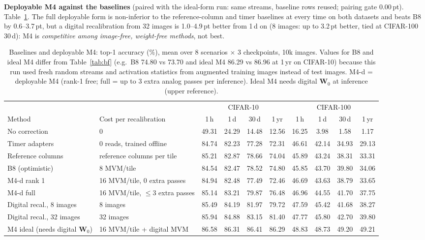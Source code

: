 \documentclass[journal]{IEEEtran}
\newcommand{\mfour}{\textsc{M4}}
\newcommand{\bviii}{\textsc{B8}}
\newcommand{\pt}{\,pt}
\newcommand{\W}{\mathbf{W}}
\begin{document}
\textbf{Deployable \mfour{} against the baselines} (paired with the ideal-form run: same streams, baseline rows reused; pairing gate 0.00\pt). Table~\ref{tab:h2}. The full deployable form is non-inferior to the reference-column and timer baselines at every time on both datasets and beats \bviii{} by 0.6--3.7\pt, but a digital recalibration from 32 images is 1.0--4.9\pt{} better from 1\,d on (8 images: up to 3.2\pt{} better, tied at CIFAR-100 30\,d): \mfour{} is \emph{competitive among image-free, weight-free methods}, not best.

\begin{table}[t]
\caption{Baselines and deployable \mfour: top-1 accuracy (\%), mean over 8 scenarios $\times$ 3 checkpoints, 10k images. Values for \bviii{} and ideal \mfour{} differ from Table~\ref{tab:bf} (e.g.\ \bviii{} 74.80 vs 73.70 and ideal \mfour{} 86.29 vs 86.96 at 1\,yr on CIFAR-10) because this run used fresh random streams and activation statistics from augmented training images instead of test images. \mfour-d = deployable \mfour{} (rank-1 free; full = up to 3 extra analog passes per inference). Ideal \mfour{} needs digital $\W_0$ at inference (upper reference).}
\label{tab:h2}
\centering\footnotesize
\begin{tabular}{lp{2.6cm}cccccccc}
\toprule
 & & \multicolumn{4}{c}{CIFAR-10} & \multicolumn{4}{c}{CIFAR-100} \\
\cmidrule(lr){3-6}\cmidrule(lr){7-10}
Method & Cost per recalibration & 1\,h & 1\,d & 30\,d & 1\,yr & 1\,h & 1\,d & 30\,d & 1\,yr \\
\midrule
No correction & 0 & 49.31 & 24.29 & 14.48 & 12.56 & 16.25 & 3.98 & 1.58 & 1.17 \\
Timer adapters & 0 reads, trained offline & 84.74 & 82.23 & 77.28 & 72.31 & 46.61 & 42.14 & 34.93 & 29.13 \\
Reference columns & reference columns per tile & 85.21 & 82.87 & 78.66 & 74.04 & 45.89 & 43.24 & 38.31 & 33.31 \\
\bviii{} (optimistic) & 8 MVM/tile & 84.54 & 82.47 & 78.52 & 74.80 & 45.85 & 43.70 & 39.80 & 34.06 \\
\mfour-d rank 1 & 16 MVM/tile, 0 extra passes & 84.94 & 82.48 & 77.49 & 72.46 & 46.69 & 43.63 & 38.79 & 33.65 \\
\mfour-d full & 16 MVM/tile, $\le3$ extra passes & 85.14 & 83.21 & 79.87 & 76.48 & 46.96 & 44.55 & 41.70 & 37.75 \\
Digital recal., 8 images & 8 images & 85.49 & 84.19 & 81.97 & 79.72 & 47.59 & 45.42 & 41.68 & 38.27 \\
Digital recal., 32 images & 32 images & 85.94 & 84.88 & 83.15 & 81.40 & 47.77 & 45.80 & 42.70 & 39.80 \\
\midrule
\mfour{} ideal (needs digital $\W_0$) & 16 MVM/tile + digital MVM & 86.58 & 86.31 & 86.41 & 86.29 & 48.83 & 48.73 & 49.20 & 49.21 \\
\bottomrule
\end{tabular}
\end{table}
\end{document}
